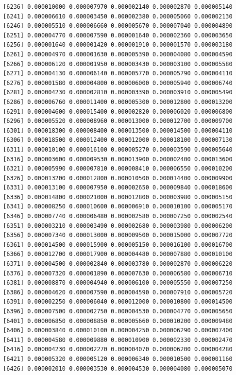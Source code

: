 \documentclass[]{article}
\begin{document}
\begin{verbatim}
 [6236] 0.000010000 0.000007970 0.000002140 0.000002870 0.000005140
 [6241] 0.000006610 0.000003450 0.000002380 0.000005060 0.000002130
 [6246] 0.000005510 0.000006660 0.000005670 0.000007040 0.000004890
 [6251] 0.000004770 0.000007590 0.000001640 0.000002360 0.000003650
 [6256] 0.000001640 0.000001420 0.000001910 0.000001570 0.000003180
 [6261] 0.000004970 0.000001630 0.000005390 0.000004080 0.000004590
 [6266] 0.000006120 0.000001950 0.000003430 0.000003100 0.000005580
 [6271] 0.000004130 0.000006140 0.000005770 0.000005790 0.000004110
 [6276] 0.000001580 0.000004800 0.000006000 0.000005940 0.000006740
 [6281] 0.000004230 0.000002810 0.000003390 0.000003910 0.000005490
 [6286] 0.000006760 0.000011400 0.000005300 0.000012800 0.000013200
 [6291] 0.000004600 0.000015400 0.000002820 0.000006020 0.000006800
 [6296] 0.000005520 0.000008960 0.000013000 0.000012700 0.000009700
 [6301] 0.000018300 0.000008400 0.000013500 0.000014500 0.000004110
 [6306] 0.000018500 0.000012400 0.000012000 0.000018100 0.000007130
 [6311] 0.000010100 0.000016100 0.000005270 0.000003590 0.000005640
 [6316] 0.000003600 0.000009530 0.000013900 0.000002400 0.000013600
 [6321] 0.000005990 0.000007810 0.000008410 0.000006550 0.000010200
 [6326] 0.000013200 0.000012800 0.000010500 0.000014400 0.000009900
 [6331] 0.000013100 0.000007950 0.000002650 0.000009840 0.000018600
 [6336] 0.000014800 0.000021000 0.000012800 0.000003980 0.000005150
 [6341] 0.000008250 0.000010600 0.000006910 0.000010100 0.000005170
 [6346] 0.000007740 0.000006480 0.000002580 0.000007250 0.000002540
 [6351] 0.000003210 0.000003490 0.000002680 0.000003980 0.000006200
 [6356] 0.000007340 0.000013000 0.000009500 0.000015000 0.000007720
 [6361] 0.000014500 0.000015900 0.000005150 0.000016100 0.000016700
 [6366] 0.000012700 0.000017900 0.000004480 0.000007880 0.000010100
 [6371] 0.000004500 0.000002840 0.000003780 0.000002870 0.000006220
 [6376] 0.000007320 0.000001890 0.000007630 0.000006580 0.000006710
 [6381] 0.000008870 0.000004940 0.000006100 0.000005550 0.000007250
 [6386] 0.000004620 0.000007590 0.000004590 0.000007910 0.000005720
 [6391] 0.000002250 0.000006040 0.000012000 0.000010800 0.000014500
 [6396] 0.000007500 0.000002750 0.000004530 0.000004770 0.000005650
 [6401] 0.000006850 0.000008850 0.000005660 0.000010200 0.000009480
 [6406] 0.000003840 0.000010100 0.000004250 0.000006290 0.000007400
 [6411] 0.000004580 0.000009880 0.000010900 0.000002330 0.000002470
 [6416] 0.000004230 0.000002270 0.000004070 0.000006200 0.000004280
 [6421] 0.000005320 0.000005120 0.000006340 0.000010500 0.000001160
 [6426] 0.000002010 0.000003530 0.000004530 0.000004080 0.000005070

\end{verbatim}
\end{document}
